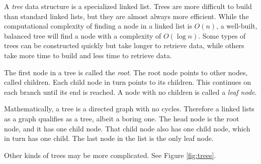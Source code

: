A \emph{tree} data structure is a specialized linked list.
Trees are more difficult to build than standard linked lists, but they are almost always more efficient.
While the computational complexity of finding a node in a linked list is $O(n)$, a well-built, balanced tree will find a node with a complexity of $O(\log{n})$.
Some types of trees can be constructed quickly but take longer to retrieve data, while others take more time to build and less time to retrieve data.

The first node in a tree is called the \emph{root}.
The root node points to other nodes, called children.
Each child node in turn points to its children.
This continues on each branch until its end is reached.
A node with no children is called a \emph{leaf node}.

Mathematically, a tree is a directed graph with no cycles.
Therefore a linked lists as a graph qualifies as a tree, albeit a boring one.
The head node is the root node, and it has one child node.
That child node also has one child node, which in turn has one child.
The last node in the list is the only leaf node.

Other kinds of trees may be more complicated.
See Figure \ref{fig:trees}.

